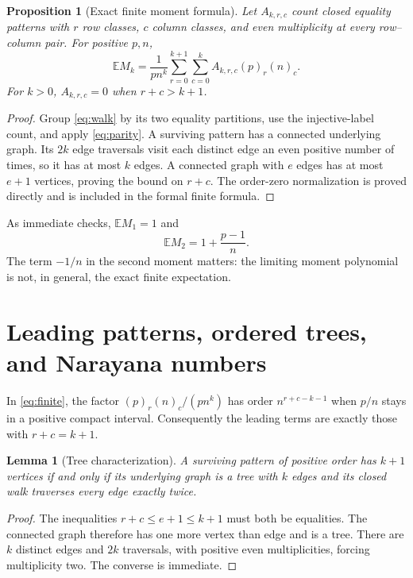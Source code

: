 \documentclass[11pt]{article}
\newtheorem{proposition}[theorem]{Proposition}
\newtheorem{lemma}[theorem]{Lemma}
\theoremstyle{remark}
\newcommand{\E}{\mathbb E}
\newcommand{\fall}[2]{(#1)_{#2}}
\begin{document}
\begin{proposition}[Exact finite moment formula]\label{prop:finite}
Let $A_{k,r,c}$ count closed equality patterns with $r$ row classes, $c$ column classes, and even multiplicity at every row--column pair. For positive $p,n$,
\begin{equation}\label{eq:finite}
 \E M_k=\frac1{pn^k}
 \sum_{r=0}^{k+1}\sum_{c=0}^{k}
 A_{k,r,c}\fall{p}{r}\fall{n}{c}.
\end{equation}
For $k>0$, $A_{k,r,c}=0$ when $r+c>k+1$.
\end{proposition}
\begin{proof}
Group \eqref{eq:walk} by its two equality partitions, use the injective-label count, and apply \eqref{eq:parity}. A surviving pattern has a connected underlying graph. Its $2k$ edge traversals visit each distinct edge an even positive number of times, so it has at most $k$ edges. A connected graph with $e$ edges has at most $e+1$ vertices, proving the bound on $r+c$. The order-zero normalization is proved directly and is included in the formal finite formula.
\end{proof}

As immediate checks, $\E M_1=1$ and
\[
 \E M_2=1+\frac{p-1}{n}.
\]
The term $-1/n$ in the second moment matters: the limiting moment polynomial is not, in general, the exact finite expectation.

\section{Leading patterns, ordered trees, and Narayana numbers}
In \eqref{eq:finite}, the factor $\fall{p}{r}\fall{n}{c}/(pn^k)$ has order $n^{r+c-k-1}$ when $p/n$ stays in a positive compact interval. Consequently the leading terms are exactly those with $r+c=k+1$.

\begin{lemma}[Tree characterization]
A surviving pattern of positive order has $k+1$ vertices if and only if its underlying graph is a tree with $k$ edges and its closed walk traverses every edge exactly twice.
\end{lemma}
\begin{proof}
The inequalities $r+c\leq e+1\leq k+1$ must both be equalities. The connected graph therefore has one more vertex than edge and is a tree. There are $k$ distinct edges and $2k$ traversals, with positive even multiplicities, forcing multiplicity two. The converse is immediate.
\end{proof}
\end{document}
